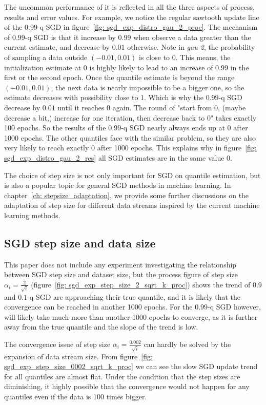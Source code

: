 The uncommon performance of it is reflected in all the three aspects of process, results and error values. For example, we notice the regular sawtooth update line of the $0.99$-q SGD in figure~\ref{fig: sgd_exp_distro_gau_2_proc}. The mechanism of $0.99$-q SGD is that it increase by $0.99$ when observe a data greater than the current estimate, and decrease by $0.01$ otherwise. Note in \textit{gau-2}, the probability of sampling a data outside $(-0.01, 0.01)$ is close to 0. This means, the initialization estimate at 0 is highly likely to lead to an increase of $0.99$ in the first or the second epoch. Once the quantile estimate is beyond the range $(-0.01, 0.01)$, the next data is nearly impossible to be a bigger one, so the estimate decreases with possibility close to 1. Which is why the $0.99$-q SGD decrease by $0.01$ until it reaches 0 again. The round of "start from 0, (maybe decrease a bit,) increase for one iteration, then decrease back to 0" takes exactly 100 epochs. So the results of the $0.99$-q SGD nearly always ends up at 0 after 1000 epochs. The other quantiles face with the similar problem, so they are also very likely to reach exactly 0 after 1000 epochs. This explains why in figure~\ref{fig: sgd_exp_distro_gau_2_res} all SGD estimates are in the same value $0$. 

The choice of step size is not only important for SGD on quantile estimation, but is also a popular topic for general SGD methods in machine learning. In chapter~\ref{ch: stepsize_adaptation}, we provide some further discussions on the adaptation of step size for different data streams inspired by the current machine learning methods.

\subsection{SGD step size and data size}

This paper does not include any experiment investigating the relationship between SGD step size and dataset size, but the process figure of step size $\alpha_i = \frac{2}{\sqrt{i}}$ (figure~\ref{fig: sgd_exp_step_size_2_sqrt_k_proc}) shows the trend of $0.9$ and $0.1$-q SGD are approaching their true quantile, and it is likely that the convergence can be reached in another 1000 epochs. For the $0.99$-q SGD however, will likely take much more than another 1000 epochs to converge, as it is further away from the true quantile and the slope of the trend is low.

The convergence issue of step size $\alpha_i = \frac{0.002}{\sqrt{i}}$ can hardly be solved by the expansion of data stream size. From figure~\ref{fig: sgd_exp_step_size_0002_sqrt_k_proc} we can see the slow SGD update trend for all quantiles are almost flat. Under the condition that the step sizes are diminishing, it highly possible that the convergence would not happen for any quantiles even if the data is 100 times bigger.

